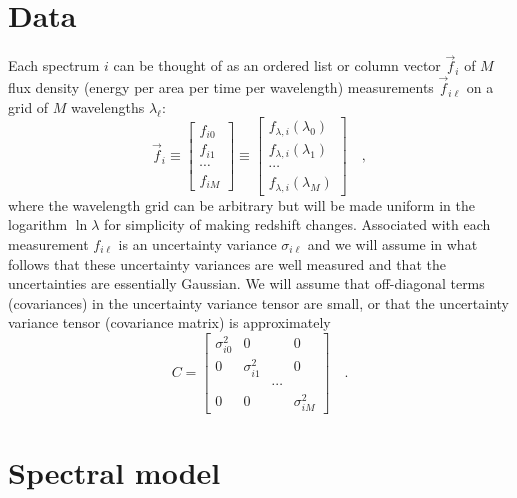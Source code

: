 \documentclass[12pt]{article}
\newcommand{\fluxvec}{\vec{f}}
\begin{document}
\section{Data}

Each spectrum $i$ can be thought of as an ordered list or column
vector $\fluxvec_i$ of $M$ flux density (energy per area per time per
wavelength) measurements $\fluxvec_{i\ell}$ on a grid of $M$
wavelengths $\lambda_{\ell}$:
\begin{equation}
\fluxvec_i
\equiv \left[\begin{array}{c} f_{i0} \\
                              f_{i1} \\
                              \cdots \\
                              f_{iM} \end{array}\right]
\equiv \left[\begin{array}{c} f_{\lambda,i}(\lambda_0) \\
                              f_{\lambda,i}(\lambda_1) \\
                                                \cdots \\
                              f_{\lambda,i}(\lambda_M) \end{array}\right]
\quad ,
\end{equation}
where the wavelength grid can be arbitrary but will be made uniform in
the logarithm $\ln\lambda$ for simplicity of making redshift changes.
Associated with each measurement $f_{i\ell}$ is an uncertainty
variance $\sigma_{i\ell}$ and we will assume in what follows that
these uncertainty variances are well measured and that the
uncertainties are essentially Gaussian.  We will assume that
off-diagonal terms (covariances) in the uncertainty variance tensor
are small, or that the uncertainty variance tensor (covariance matrix)
is approximately
\begin{equation}
C = \left[\begin{array}{cccc} \sigma_{i0}^2 & 0 & & 0 \\
                              0 & \sigma_{i1}^2 & & 0 \\
                              & & \cdots & \\
                              0 & 0 & & \sigma_{iM}^2 \end{array}\right]
\quad .
\end{equation}

\section{Spectral model}
\end{document}
